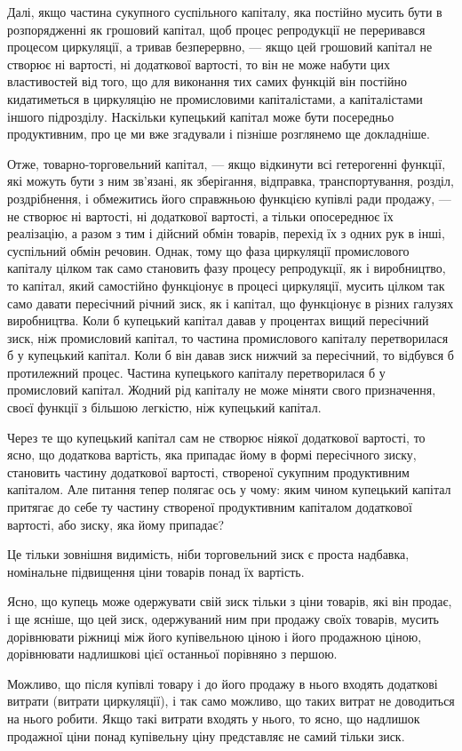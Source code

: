 \parcont{}  %
Далі, якщо частина сукупного суспільного капіталу, яка постійно
мусить бути в розпорядженні як грошовий капітал, щоб процес
репродукції не переривався процесом циркуляції, а тривав безперервно,
— якщо цей грошовий капітал не створює ні вартості,
ні додаткової вартості, то він не може набути цих властивостей
від того, що для виконання тих самих функцій він постійно кидатиметься
в циркуляцію не промисловими капіталістами, а капіталістами
іншого підрозділу. Наскільки купецький капітал може
бути посередньо продуктивним, про це ми вже згадували і пізніше
розглянемо ще докладніше.

Отже, товарно-торговельний капітал, — якщо відкинути всі
гетерогенні функції, які можуть бути з ним зв’язані, як зберігання,
відправка, транспортування, розділ, роздрібнення, і обмежитись
його справжньою функцією купівлі ради продажу, —
не створює ні вартості, ні додаткової вартості, а тільки опосереднює
їх реалізацію, а разом з тим і дійсний обмін товарів, перехід
їх з одних рук в інші, суспільний обмін речовин. Однак,
тому що фаза циркуляції промислового капіталу цілком так само
становить фазу процесу репродукції, як і виробництво, то капітал,
який самостійно функціонує в процесі циркуляції, мусить
цілком так само давати пересічний річний зиск, як і капітал,
що функціонує в різних галузях виробництва. Коли б купецький
капітал давав у процентах вищий пересічний зиск, ніж
промисловий капітал, то частина промислового капіталу перетворилася
б у купецький капітал. Коли б він давав зиск нижчий
за пересічний, то відбувся б протилежний процес. Частина
купецького капіталу перетворилася б у промисловий капітал.
Жодний рід капіталу не може міняти свого призначення, своєї
функції з більшою легкістю, ніж купецький капітал.

Через те що купецький капітал сам не створює ніякої додаткової
вартості, то ясно, що додаткова вартість, яка припадає
йому в формі пересічного зиску, становить частину додаткової
вартості, створеної сукупним продуктивним капіталом. Але питання
тепер полягає ось у чому: яким чином купецький капітал
притягає до себе ту частину створеної продуктивним капіталом
додаткової вартості, або зиску, яка йому припадає?

Це тільки зовнішня видимість, ніби торговельний зиск є проста
надбавка, номінальне підвищення ціни товарів понад їх вартість.

Ясно, що купець може одержувати свій зиск тільки з ціни
товарів, які він продає, і ще ясніше, що цей зиск, одержуваний
ним при продажу своїх товарів, мусить дорівнювати ріжниці
між його купівельною ціною і його продажною ціною, дорівнювати
надлишкові цієї останньої порівняно з першою.

Можливо, що після купівлі товару і до його продажу в нього
входять додаткові витрати (витрати циркуляції), і так само можливо,
що таких витрат не доводиться на нього робити. Якщо
такі витрати входять у нього, то ясно, що надлишок продажної
ціни понад купівельну ціну представляє не самий тільки зиск.
\parbreak{}  %
